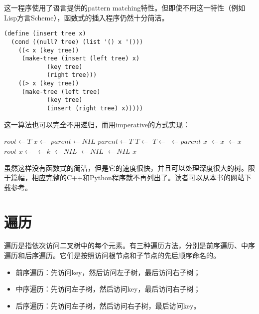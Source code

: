 \documentclass[UTF8]{article}
\begin{document}
这一程序使用了语言提供的pattern matching特性。但即使不用这一特性（例如Lisp方言Scheme），函数式的插入程序仍然十分简洁。

\lstset{language=lisp}
\begin{lstlisting}
(define (insert tree x)
  (cond ((null? tree) (list '() x '()))
	((< x (key tree))
	 (make-tree (insert (left tree) x)
		    (key tree)
		    (right tree)))
	((> x (key tree))
	 (make-tree (left tree)
		    (key tree)
		    (insert (right tree) x)))))
\end{lstlisting}

这一算法也可以完全不用递归，而用imperative的方式实现：

\begin{algorithmic}[1]
  \State $root \gets T$
  \State $x \gets$ 
  \State $parent \gets NIL$
    \State $parent \gets T$
      \State $T \gets $ 
    \Else
      \State $T \gets $ 
    \EndIf
  \EndWhile
  \State {} $\gets parent$
   
    \State \Return $x$
    \State {} $\gets x$
  \Else
    \State {} $\gets x$
  \EndIf
  \State \Return $root$
\EndFunction
\Statex
{}
  \State $x \gets $ 
  \State {} $ \gets k$
  \State {} $ \gets NIL$
  \State {} $ \gets NIL$
  \State {} $ \gets NIL$
  \State \Return $x$
\EndFunction
\end{algorithmic}

虽然这样没有函数式的简洁，但是它的速度很快，并且可以处理深度很大的树。限于篇幅，相应完整的C++和Python程序就不再列出了。读者可以从本书的网站下载参考。

\section{遍历}

遍历是指依次访问二叉树中的每个元素。有三种遍历方法，分别是前序遍历、中序遍历和后序遍历。它们是按照访问根节点和子节点的先后顺序命名的。

\begin{itemize}
\item 前序遍历：先访问key，然后访问左子树，最后访问右子树；
\item 中序遍历：先访问左子树，然后访问key，最后访问右子树；
\item 后序遍历：先访问左子树，然后访问右子树，最后访问key。
\end{itemize}
\end{document}
